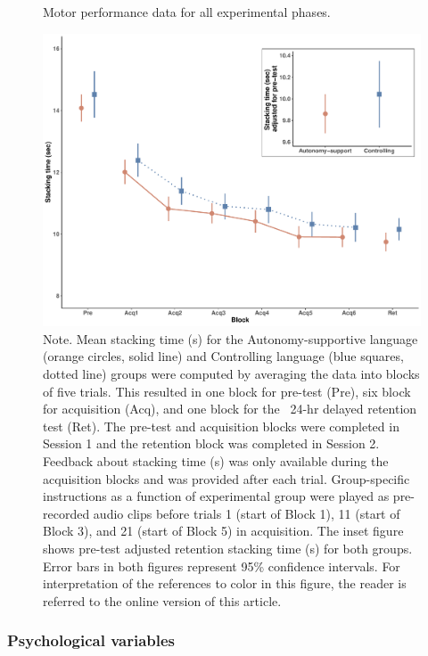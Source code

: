\documentclass[man,floatsintext,donotrepeattitle,letterpaper,12pt]{apa7}
\begin{document}
\begin{figure}[htbp]
    \caption{Motor performance data for all experimental phases.}
    \centering
    \includegraphics[scale=0.55]{../../figs/fig2.pdf}
    \setlength{\belowcaptionskip}{-2em}
    \caption*{\singlespacing \small Note. \normalfont Mean stacking time (s) for the Autonomy-supportive language (orange circles, solid line) and Controlling language (blue squares, dotted line) groups were computed by averaging the data into blocks of five trials. This resulted in one block for pre-test (Pre), six block for acquisition (Acq), and one block for the ~24-hr delayed retention test (Ret). The pre-test and acquisition blocks were completed in Session 1 and the retention block was completed in Session 2. Feedback about stacking time (s) was only available during the acquisition blocks and was provided after each trial. Group-specific instructions as a function of experimental group were played as pre-recorded audio clips before trials 1 (start of Block 1), 11 (start of Block 3), and 21 (start of Block 5) in acquisition. The inset figure shows pre-test adjusted retention stacking time (s) for both groups. Error bars in both figures represent 95\% confidence intervals. For interpretation of the references to color in this figure, the reader is referred to the online version of this article.}
    \label{fig:fig2}
\end{figure}

\clearpage

\subsubsection{Psychological variables}
\end{document}
